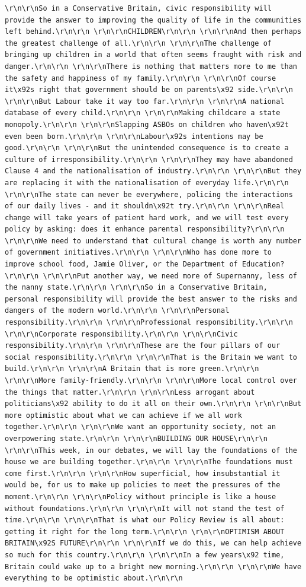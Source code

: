 \documentclass[
  letterpaper,
  DIV=11,
  numbers=noendperiod]{scrreprt}
\begin{document}
\begin{verbatim}
\r\n\r\nSo in a Conservative Britain, civic responsibility will provide the answer to improving the quality of life in the communities left behind.\r\n\r\n \r\n\r\nCHILDREN\r\n\r\n \r\n\r\nAnd then perhaps the greatest challenge of all.\r\n\r\n \r\n\r\nThe challenge of bringing up children in a world that often seems fraught with risk and danger.\r\n\r\n \r\n\r\nThere is nothing that matters more to me than the safety and happiness of my family.\r\n\r\n \r\n\r\nOf course it\x92s right that government should be on parents\x92 side.\r\n\r\n \r\n\r\nBut Labour take it way too far.\r\n\r\n \r\n\r\nA national database of every child.\r\n\r\n \r\n\r\nMaking childcare a state monopoly.\r\n\r\n \r\n\r\nSlapping ASBOs on children who haven\x92t even been born.\r\n\r\n \r\n\r\nLabour\x92s intentions may be good.\r\n\r\n \r\n\r\nBut the unintended consequence is to create a culture of irresponsibility.\r\n\r\n \r\n\r\nThey may have abandoned Clause 4 and the nationalisation of industry.\r\n\r\n \r\n\r\nBut they are replacing it with the nationalisation of everyday life.\r\n\r\n \r\n\r\nThe state can never be everywhere, policing the interactions of our daily lives - and it shouldn\x92t try.\r\n\r\n \r\n\r\nReal change will take years of patient hard work, and we will test every policy by asking: does it enhance parental responsibility?\r\n\r\n \r\n\r\nWe need to understand that cultural change is worth any number of government initiatives.\r\n\r\n \r\n\r\nWho has done more to improve school food, Jamie Oliver, or the Department of Education?\r\n\r\n \r\n\r\nPut another way, we need more of Supernanny, less of the nanny state.\r\n\r\n \r\n\r\nSo in a Conservative Britain, personal responsibility will provide the best answer to the risks and dangers of the modern world.\r\n\r\n \r\n\r\nPersonal responsibility.\r\n\r\n \r\n\r\nProfessional responsibility.\r\n\r\n \r\n\r\nCorporate responsibility.\r\n\r\n \r\n\r\nCivic responsibility.\r\n\r\n \r\n\r\nThese are the four pillars of our social responsibility.\r\n\r\n \r\n\r\nThat is the Britain we want to build.\r\n\r\n \r\n\r\nA Britain that is more green.\r\n\r\n \r\n\r\nMore family-friendly.\r\n\r\n \r\n\r\nMore local control over the things that matter.\r\n\r\n \r\n\r\nLess arrogant about politicians\x92 ability to do it all on their own.\r\n\r\n \r\n\r\nBut more optimistic about what we can achieve if we all work together.\r\n\r\n \r\n\r\nWe want an opportunity society, not an overpowering state.\r\n\r\n \r\n\r\nBUILDING OUR HOUSE\r\n\r\n \r\n\r\nThis week, in our debates, we will lay the foundations of the house we are building together.\r\n\r\n \r\n\r\nThe foundations must come first.\r\n\r\n \r\n\r\nHow superficial, how insubstantial it would be, for us to make up policies to meet the pressures of the moment.\r\n\r\n \r\n\r\nPolicy without principle is like a house without foundations.\r\n\r\n \r\n\r\nIt will not stand the test of time.\r\n\r\n \r\n\r\nThat is what our Policy Review is all about: getting it right for the long term.\r\n\r\n \r\n\r\nOPTIMISM ABOUT BRITAIN\x92S FUTURE\r\n\r\n \r\n\r\nIf we do this, we can help achieve so much for this country.\r\n\r\n \r\n\r\nIn a few years\x92 time, Britain could wake up to a bright new morning.\r\n\r\n \r\n\r\nWe have everything to be optimistic about.\r\n\r\n 
\end{verbatim}
\end{document}
